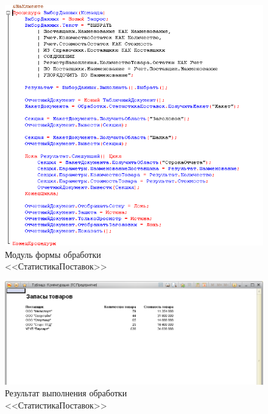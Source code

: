 \begin{figure}[h!]
  \centering
  \includegraphics[width=130mm]{pic/query_input_stats_module}
  \caption{Модуль формы обработки \\ <<СтатистикаПоставок>>}
  \label{fig:query_input_stats_module}
\end{figure}

\begin{figure}[h!]
  \centering
  \includegraphics[width=150mm]{pic/query_input_stats_result}
  \caption{Результат выполнения обработки \\
    <<СтатистикаПоставок>>}
  \label{fig:query_input_stats_result}
\end{figure}
